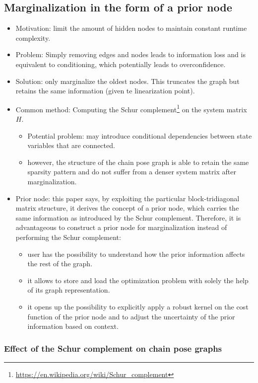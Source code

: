 \documentclass[letterpaper,10pt]{article}
\begin{document}
\subsection{Marginalization in the form of a prior node}

\begin{itemize}
	\item Motivation: limit the amount of hidden nodes to maintain constant runtime complexity.
	\item Problem: Simply removing edges and nodes leads to information loss and is equivalent to conditioning, which potentially leads to overconfidence.
	\item Solution: only marginalize the oldest nodes. This truncates the graph but retains the same information (given te linearization point).
	\item Common method: Computing the Schur complement\footnote{\url{https://en.wikipedia.org/wiki/Schur_complement}} on the system matrix $H$.
	\begin{itemize}
		\item Potential problem: may introduce conditional dependencies between state variables that are connected.
		\item however, the structure of the chain pose graph is able to retain the same sparsity pattern and do not suffer from a denser system matrix after marginalization.
	\end{itemize}
	\item Prior node: this paper says, by exploiting the particular block-tridiagonal matrix structure, it derives the concept of a prior node, which carries the same information as introduced by the Schur complement. Therefore, it is advantageous to construct a prior node for marginalization instead of performing the Schur complement:
	\begin{itemize}
		\item user has the possibility to understand how the prior information affects the rest of the graph.
		\item it allows to store and load the optimization problem with solely the help of its graph representation.
		\item it opens up the possibility to explicitly apply a robust kernel on the cost function of the prior node and to adjust the uncertainty of the prior information based on context.
	\end{itemize}
\end{itemize}

\subsubsection{Effect of the Schur complement on chain pose graphs}
\end{document}
